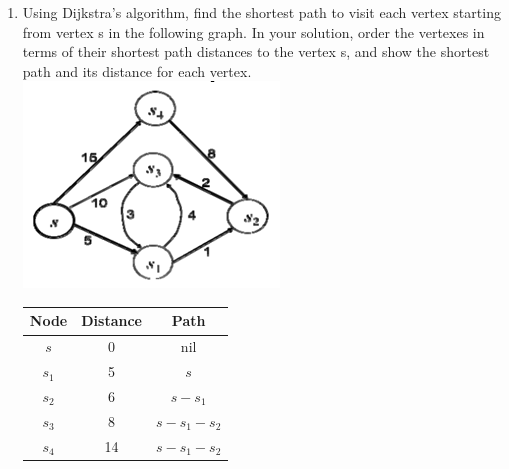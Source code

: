 \documentclass{article}
\begin{document}
\begin{enumerate}
    \item Using Dijkstra’s algorithm, find the shortest path to visit each 
    vertex starting from vertex s in the following graph. In your solution, 
    order the vertexes in terms of their shortest path distances to the vertex 
    s, and show the shortest path and its distance for each vertex. \newline
    \includegraphics[scale=0.75]{p6_graph}
    \begin{tabular}{|c|c|c|}
    \hline
    Node & Distance & Path \\
    \hline
    $s$ & 0 & nil \\
    \hline
    $s_1$ & 5 & $s$\\
    \hline
    $s_2$ & 6 & $s-s_1$\\
    \hline
    $s_3$ & 8 & $s-s_1-s_2$\\
    \hline
    $s_4$ & 14 & $s-s_1-s_2$\\
    \hline
    \end{tabular}


\end{enumerate}
\end{document}
